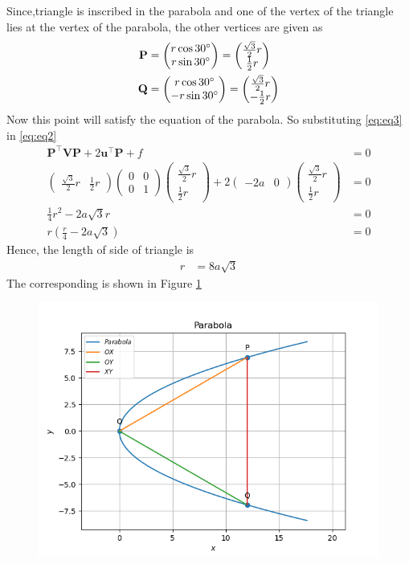 \documentclass[12pt]{article}
\providecommand{\brak}[1]{\ensuremath{\left(#1\right)}}
\newcommand{\myvec}[1]{\ensuremath{\begin{pmatrix}#1\end{pmatrix}}}
\let\vec\mathbf
\begin{document}
Since,triangle is inscribed in the parabola and one of the vertex of the triangle lies at the vertex of the parabola, the other vertices are given as
\begin{align}
	\label{eq:eq3}
	\vec{P} &= \myvec{r\cos 30\degree\\r\sin 30\degree} = \myvec{\frac{\sqrt{3}}{2}r\\\frac{1}{2}r}\\
	\vec{Q} &= \myvec{r\cos 30\degree\\-r\sin 30\degree} = \myvec{\frac{\sqrt{3}}{2}r\\-\frac{1}{2}r}
\end{align}
Now this point will satisfy the equation of the parabola. So substituting \eqref{eq:eq3} in \eqref{eq:eq2}
\begin{align}
	\vec{P}^\top \vec{V}\vec{P}+2\vec{u}^\top \vec{P}+f&=0\\
	\myvec{\frac{\sqrt{3}}{2}r&\frac{1}{2}r}\myvec{0&0\\0&1}\myvec{\frac{\sqrt{3}}{2}r\\\frac{1}{2}r}+2\myvec{-2a&0}\myvec{\frac{\sqrt{3}}{2}r\\\frac{1}{2}r} &= 0\\
	\frac{1}{4}r^2 - 2a\sqrt{3}r &= 0\\
	r\brak{\frac{r}{4} - 2a\sqrt{3}} &= 0
\end{align}
Hence, the length of side of triangle is
\begin{align}
	r &= 8a\sqrt{3}
\end{align}
The corresponding is shown in Figure \ref{fig:Fig1}
\begin{figure}[!h]
	\begin{center} 
	    \includegraphics[width=\columnwidth]{figs/conic5}
	\end{center}
\caption{}
\label{fig:Fig1}
\end{figure}
\end{document}
